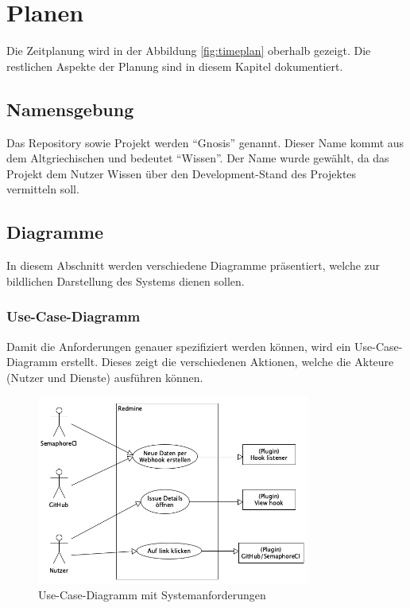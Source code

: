 \chapter{Planen}
\label{chap:plan}
Die Zeitplanung wird in der Abbildung \ref{fig:timeplan} oberhalb gezeigt. Die restlichen Aspekte der Planung sind in diesem Kapitel dokumentiert.

\section{Namensgebung}
Das Repository sowie Projekt werden \enquote{Gnosis} genannt. Dieser Name kommt aus dem Altgriechischen und bedeutet
\enquote{Wissen}. Der Name wurde gewählt, da das Projekt dem Nutzer Wissen über den Development-Stand des Projektes
vermitteln soll. 

\section{Diagramme}
In diesem Abschnitt werden verschiedene Diagramme präsentiert, welche zur bildlichen Darstellung des Systems dienen sollen.
\subsection{Use-Case-Diagramm}
Damit die Anforderungen genauer spezifiziert werden können, wird ein Use-Case-Diagramm erstellt. Dieses zeigt die verschiedenen
Aktionen, welche die Akteure (Nutzer und Dienste) ausführen können.
\begin{figure}[H]
  \centering
  \includegraphics[width=0.8\textwidth]{images/use-case/base.png}
  \caption[Ein Use-Case-Diagramm, welches die verschiedenen Systemanforderungen aufzeigt]{Use-Case-Diagramm mit Systemanforderungen}
  \label{fig:use_case}
\end{figure}
